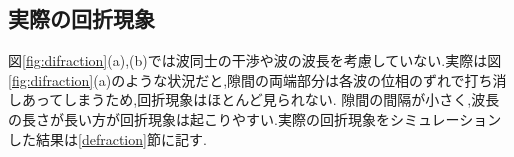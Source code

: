 \subsection{実際の回折現象}
図\ref{fig:difraction}(a),(b)では波同士の干渉や波の波長を考慮していない.実際は図\ref{fig:difraction}(a)のような状況だと,隙間の両端部分は各波の位相のずれで打ち消しあってしまうため,回折現象はほとんど見られない. 隙間の間隔が小さく,波長の長さが長い方が回折現象は起こりやすい.実際の回折現象をシミュレーションした結果は\ref{defraction}節に記す.





